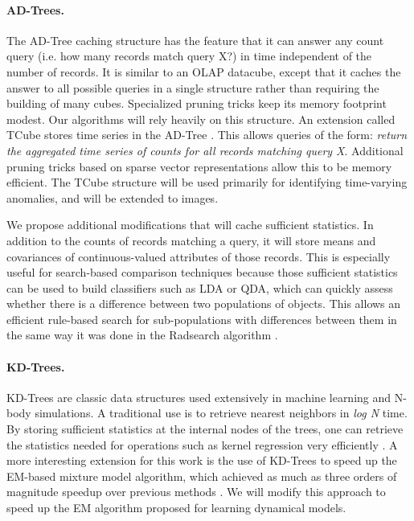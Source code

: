 \documentclass[prd,nofootbib,floatfix,11pt,tightenlines]{revtex4}
\begin{document}
\paragraph{AD-Trees.}
The AD-Tree \cite{Moore97a} caching structure has the feature that it can
answer any count query (i.e. how many records match query X?) in time
independent of the number of records.  It is similar to an OLAP datacube,
except that it caches the answer to all possible queries in a single
structure rather than requiring the building of many cubes.  Specialized
pruning tricks keep its memory footprint modest.  Our algorithms will rely
heavily on this structure. An extension called TCube stores time series in the AD-Tree
\cite{Sabhnani06}.  This allows queries of the form: {\it return the
 aggregated time series of counts for all records matching query X}.
Additional pruning tricks based on sparse vector representations allow this
to be memory efficient.  The TCube structure will be used primarily for
identifying time-varying anomalies, and will be extended to images.

We propose additional modifications that will cache sufficient
statistics.  In addition to the counts of records matching a query, it will
store means and covariances of continuous-valued attributes of those
records.  This is especially useful for search-based comparison techniques
because those sufficient statistics can be used to build classifiers
such as LDA or QDA, which can quickly assess whether there is a difference
between two populations of objects.  This allows an efficient rule-based
search for sub-populations with differences between them in the same way it
was done in the Radsearch algorithm \cite{Moore02}.

\paragraph{KD-Trees.}
KD-Trees are classic data structures used extensively in
machine learning and N-body simulations.  A traditional use is to retrieve
nearest neighbors in {\it log N} time.  By storing sufficient statistics at
the internal nodes of the trees, one can retrieve the
statistics needed for operations such as kernel regression very efficiently
\cite{Moore97}.  
A more interesting extension for this work is the use of KD-Trees
to speed up the EM-based mixture model algorithm, which achieved as much as
three orders of magnitude speedup over previous methods \cite{Moore99}.  We
will modify this approach to speed up the EM algorithm proposed for
learning dynamical models.
\end{document}
